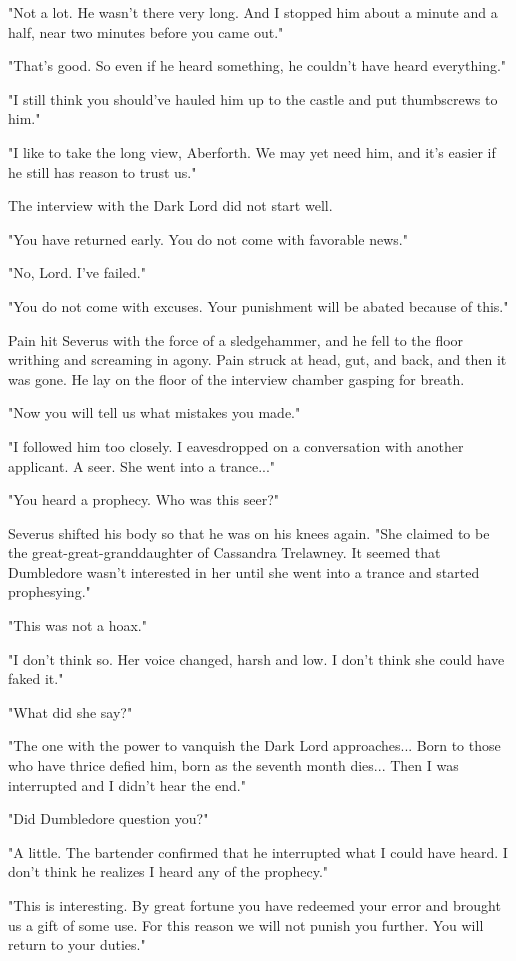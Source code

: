 \documentclass[a4paper,11pt]{article}
\begin{document}
"Not a lot. He wasn't there very long. And I stopped him about a minute and a half, near two minutes before you came out."

"That's good. So even if he heard something, he couldn't have heard everything."

"I still think you should've hauled him up to the castle and put thumbscrews to him."

"I like to take the long view, Aberforth. We may yet need him, and it's easier if he still has reason to trust us."

The interview with the Dark Lord did not start well.

"You have returned early. You do not come with favorable news."

"No, Lord. I've failed."

"You do not come with excuses. Your punishment will be abated because of this."

Pain hit Severus with the force of a sledgehammer, and he fell to the floor writhing and screaming in agony. Pain struck at head, gut, and back, and then it was gone. He lay on the floor of the interview chamber gasping for breath.

"Now you will tell us what mistakes you made."

"I followed him too closely. I eavesdropped on a conversation with another applicant. A seer. She went into a trance..."

"You heard a prophecy. Who was this seer?"

Severus shifted his body so that he was on his knees again. "She claimed to be the great-great-granddaughter of Cassandra Trelawney. It seemed that Dumbledore wasn't interested in her until she went into a trance and started prophesying."

"This was not a hoax."

"I don't think so. Her voice changed, harsh and low. I don't think she could have faked it."

"What did she say?"

"The one with the power to vanquish the Dark Lord approaches... Born to those who have thrice defied him, born as the seventh month dies... Then I was interrupted and I didn't hear the end."

"Did Dumbledore question you?"

"A little. The bartender confirmed that he interrupted what I could have heard. I don't think he realizes I heard any of the prophecy."

"This is interesting. By great fortune you have redeemed your error and brought us a gift of some use. For this reason we will not punish you further. You will return to your duties."
\end{document}
